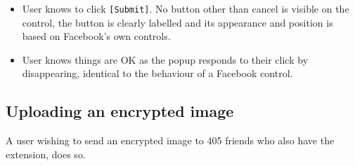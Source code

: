 \begin{desc}
\begin{itemize}
            \item User knows to click {\tt [Submit]}. No button other than cancel is visible on the control, the button is clearly labelled and its appearance and position is based on Facebook's own controls.
            
            \item User knows things are OK as the popup responds to their click by disappearing, identical to the behaviour of a Facebook control.
        
        \end{itemize}
    
\end{desc}


\subsection{Uploading an encrypted image}
A user wishing to send an encrypted image to 405 friends who also have the extension, does so.

